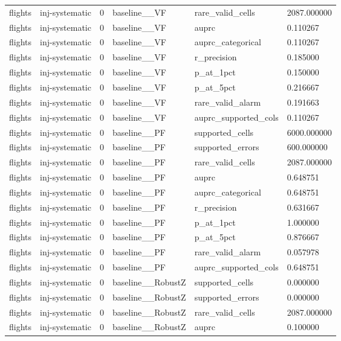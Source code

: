 \begin{tabular}{llllll}
flights & inj-systematic & 0 & baseline\_\_VF & rare\_valid\_cells & 2087.000000 \\
flights & inj-systematic & 0 & baseline\_\_VF & auprc & 0.110267 \\
flights & inj-systematic & 0 & baseline\_\_VF & auprc\_categorical & 0.110267 \\
flights & inj-systematic & 0 & baseline\_\_VF & r\_precision & 0.185000 \\
flights & inj-systematic & 0 & baseline\_\_VF & p\_at\_1pct & 0.150000 \\
flights & inj-systematic & 0 & baseline\_\_VF & p\_at\_5pct & 0.216667 \\
flights & inj-systematic & 0 & baseline\_\_VF & rare\_valid\_alarm & 0.191663 \\
flights & inj-systematic & 0 & baseline\_\_VF & auprc\_supported\_cols & 0.110267 \\
flights & inj-systematic & 0 & baseline\_\_PF & supported\_cells & 6000.000000 \\
flights & inj-systematic & 0 & baseline\_\_PF & supported\_errors & 600.000000 \\
flights & inj-systematic & 0 & baseline\_\_PF & rare\_valid\_cells & 2087.000000 \\
flights & inj-systematic & 0 & baseline\_\_PF & auprc & 0.648751 \\
flights & inj-systematic & 0 & baseline\_\_PF & auprc\_categorical & 0.648751 \\
flights & inj-systematic & 0 & baseline\_\_PF & r\_precision & 0.631667 \\
flights & inj-systematic & 0 & baseline\_\_PF & p\_at\_1pct & 1.000000 \\
flights & inj-systematic & 0 & baseline\_\_PF & p\_at\_5pct & 0.876667 \\
flights & inj-systematic & 0 & baseline\_\_PF & rare\_valid\_alarm & 0.057978 \\
flights & inj-systematic & 0 & baseline\_\_PF & auprc\_supported\_cols & 0.648751 \\
flights & inj-systematic & 0 & baseline\_\_RobustZ & supported\_cells & 0.000000 \\
flights & inj-systematic & 0 & baseline\_\_RobustZ & supported\_errors & 0.000000 \\
flights & inj-systematic & 0 & baseline\_\_RobustZ & rare\_valid\_cells & 2087.000000 \\
flights & inj-systematic & 0 & baseline\_\_RobustZ & auprc & 0.100000 \\

\end{tabular}

